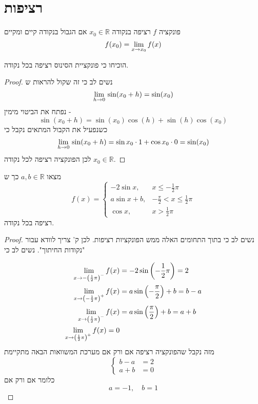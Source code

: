 \documentclass{article}
\begin{document}
\section{רציפות}
\begin{definition}
פונקציה 
$f$
רציפה בנקודה 
$x_0\in\mathbb{R}$
אם הגבול בנקודה קיים ומקיים 
\[f(x_0) = \underset{x\rightarrow x_0}{\lim}\, f(x)\]
\end{definition}

\begin{exercise}
הוכיחו כי פונקציית הסינוס רציפה בכל נקודה.
\end{exercise}

\begin{proof}
נשים לב כי זה שקול להראות ש 
\[\underset{h\rightarrow0}{\lim}\, \sin(x_0+h) = \sin(x_0)\]
נפתח את הביטוי מימין - 
\[\sin(x_0+h) = \sin(x_0)\cos(h) + \sin(h)\cos(x_0)\]
כשנפעיל את הקבול המתאים נקבל כי 
\[\underset{h\rightarrow0}{\lim}\,\sin(x_0+h) = \sin x_0\cdot 1+\cos x_0\cdot 0 = \sin(x_0) \]
לכן הפונקציה רציפה לכל נקודה 
$x_0\in\mathbb{R}$.
\end{proof}

\begin{exercise}
מצאו 
$a,b\in\mathbb{R}$
כך ש 
\[f(x) = \begin{cases}-2\sin x,& x\leq-\frac{1}{2}\pi \\ a\sin x + b,& -\frac{\pi}{2}<x\leq\frac{1}{2}\pi \\ \cos x,& x>\frac{1}{2}\pi\end{cases}\]
רציפה בכל נקודה.
\end{exercise}

\begin{proof}
נשים לב כי בתוך התחומים האלה ממש הפונקציות רציפות. לכן ק' צריך לוודא עבור "נקודות החיתוך". נשים לב כי 

\begin{align*}
\underset{x\rightarrow-\left(\frac{1}{2}\pi\right)^-}{\lim}\, f(x) &= -2\sin\left(-\frac{1}{2}\pi\right)=2 \\
\underset{x\rightarrow\left(-\frac{1}{2}\pi\right)^+}{\lim}\, f(x) &= a\sin\left(-\frac{\pi}{2}\right) + b = b-a \\
\underset{x\rightarrow\left(\frac{1}{2}\pi\right)^-}{\lim}\, f(x) &= a\sin\left(\frac{\pi}{2}\right) + b = a+b \\
\underset{x\rightarrow\left(\frac{1}{2}\pi\right)^+}{\lim}\, f(x) = 0
\end{align*}
מזה נקבל שהפונקציה רציפה אם ורק אם מערכת המשוואות הבאה מתקיימת 
\[\begin{cases} b-a&=2 \\ a+b&=0\end{cases}\]
כלומר אם ורק אם 
\[a=-1, \quad b=1 \]
\end{proof}
\end{document}
